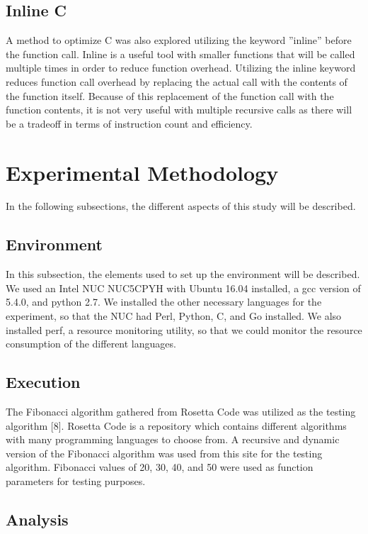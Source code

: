 \documentclass{sig-alternate}
\begin{document}
\subsection{Inline C}

A method to optimize C was also explored utilizing the keyword ''inline'' before the function call. Inline is a useful tool with smaller functions that will be called multiple times in order to reduce function overhead. Utilizing the inline keyword reduces function call overhead by replacing the actual call with the contents of the function itself. Because of this replacement of the function call with the function contents, it is not very useful with multiple recursive calls as there will be a tradeoff in terms of instruction count and efficiency.

\section{Experimental Methodology}

In the following subsections, the different aspects of this study will be described.

\subsection{Environment}

In this subsection, the elements used to set up the environment will be described. We used an Intel NUC NUC5CPYH with Ubuntu 16.04 installed, a gcc version of 5.4.0, and python 2.7. We installed the other necessary languages for the experiment, so that the NUC had Perl, Python, C, and Go installed. We also installed perf, a resource monitoring utility, so that we could monitor the resource consumption of the different languages.    

\subsection{Execution}

The Fibonacci algorithm gathered from Rosetta Code was utilized as the testing algorithm [8]. Rosetta Code is a repository which contains different algorithms with many programming languages to choose from. A recursive and dynamic version of the Fibonacci algorithm was used from this site for the testing algorithm. Fibonacci values of 20, 30, 40, and 50 were used as function parameters for testing purposes.

\subsection{Analysis}
\end{document}
